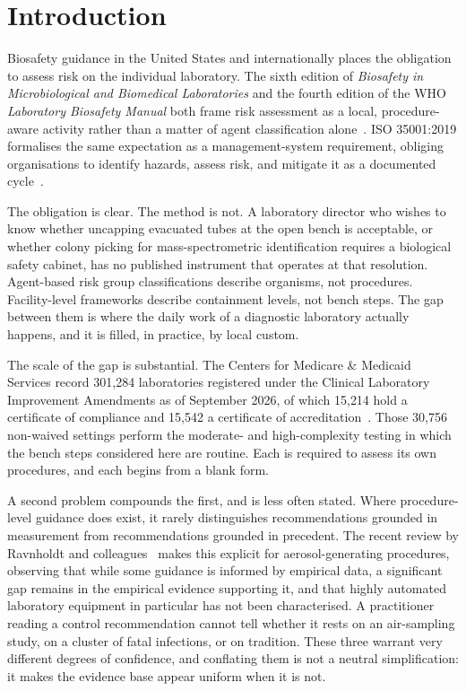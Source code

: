 \section{Introduction}

Biosafety guidance in the United States and internationally places the obligation to
assess risk on the individual laboratory. The sixth edition of \emph{Biosafety in
Microbiological and Biomedical Laboratories} and the fourth edition of the WHO
\emph{Laboratory Biosafety Manual} both frame risk assessment as a local, procedure-aware
activity rather than a matter of agent classification alone~\cite{bmbl6,wholbm4}. ISO
35001:2019 formalises the same expectation as a management-system requirement, obliging
organisations to identify hazards, assess risk, and mitigate it as a documented
cycle~\cite{iso35001}.

The obligation is clear. The method is not. A laboratory director who wishes to know
whether uncapping evacuated tubes at the open bench is acceptable, or whether colony
picking for mass-spectrometric identification requires a biological safety cabinet, has no
published instrument that operates at that resolution. Agent-based risk group
classifications describe organisms, not procedures. Facility-level frameworks describe
containment levels, not bench steps. The gap between them is where the daily work of a
diagnostic laboratory actually happens, and it is filled, in practice, by local custom.

The scale of the gap is substantial. The Centers for Medicare \& Medicaid Services record
301{,}284 laboratories registered under the Clinical Laboratory Improvement Amendments as
of September 2026, of which 15{,}214 hold a certificate of compliance and 15{,}542 a
certificate of accreditation~\cite{cms2026}. Those 30{,}756 non-waived settings perform
the moderate- and high-complexity testing in which the bench steps considered here are
routine. Each is required to assess its own procedures, and each begins from a blank form.

A second problem compounds the first, and is less often stated. Where procedure-level
guidance does exist, it rarely distinguishes recommendations grounded in measurement from
recommendations grounded in precedent. The recent review by Ravnholdt and
colleagues~\cite{ravnholdt2025} makes this explicit for aerosol-generating procedures,
observing that while some guidance is informed by empirical data, a significant gap
remains in the empirical evidence supporting it, and that highly automated laboratory
equipment in particular has not been characterised. A practitioner reading a control
recommendation cannot tell whether it rests on an air-sampling study, on a cluster of
fatal infections, or on tradition. These three warrant very different degrees of
confidence, and conflating them is not a neutral simplification: it makes the evidence
base appear uniform when it is not.

